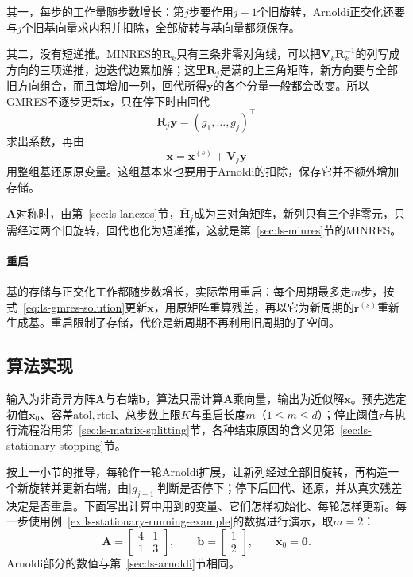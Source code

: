 其一，每步的工作量随步数增长：第$j$步要作用$j-1$个旧旋转，Arnoldi正交化还要与$j$个旧基向量求内积并扣除，全部旋转与基向量都须保存。

其二，没有短递推。MINRES的$\bm R_k$只有三条非零对角线，可以把$\bm V_k\bm R_k^{-1}$的列写成方向的三项递推，边迭代边累加解；这里$\bm R_j$是满的上三角矩阵，新方向要与全部旧方向组合，而且每增加一列，回代所得$\bm y$的各个分量一般都会改变。所以GMRES不逐步更新$\bm x$，只在停下时由回代
\begin{equation}
 \bm R_j\bm y=(g_1,\ldots,g_j)^\top
 \label{eq:ls-gmres-back-substitution}
\end{equation}
求出系数，再由
\begin{equation}
 \bm x=\bm x^{(s)}+\bm V_j\bm y
 \label{eq:ls-gmres-solution}
\end{equation}
用整组基还原原变量。这组基本来也要用于Arnoldi的扣除，保存它并不额外增加存储。

$\bm A$对称时，由第~\ref{sec:ls-lanczos}节，$\overline{\bm H}_j$成为三对角矩阵，新列只有三个非零元，只需经过两个旧旋转，回代也化为短递推，这就是第~\ref{sec:ls-minres}节的MINRES。

\paragraph{重启}
基的存储与正交化工作都随步数增长，实际常用重启：每个周期最多走$m$步，按式~\eqref{eq:ls-gmres-solution}更新$\bm x$，用原矩阵重算残差，再以它为新周期的$\bm r^{(s)}$重新生成基。重启限制了存储，代价是新周期不再利用旧周期的子空间。

\subsection{算法实现}

输入为非奇异方阵$\bm A$与右端$\bm b$，算法只需计算$\bm A$乘向量，输出为近似解$\bm x$。预先选定初值$\bm x_0$、容差$\mathrm{atol},\mathrm{rtol}$、总步数上限$K$与重启长度$m$（$1\le m\le d$）；停止阈值$\tau$与执行流程沿用第~\ref{sec:ls-matrix-splitting}节，各种结束原因的含义见第~\ref{sec:ls-stationary-stopping}节。

按上一小节的推导，每轮作一轮Arnoldi扩展，让新列经过全部旧旋转，再构造一个新旋转并更新右端，由$\lvert g_{j+1}\rvert$判断是否停下；停下后回代、还原，并从真实残差决定是否重启。下面写出计算中用到的变量、它们怎样初始化、每轮怎样更新。每一步使用例~\ref{ex:ls-stationary-running-example}的数据进行演示，取$m=2$：
\[
 \bm A=\begin{bmatrix}4&1\\1&3\end{bmatrix},\qquad
 \bm b=\begin{bmatrix}1\\2\end{bmatrix},\qquad
 \bm x_0=\bm 0 .
\]
Arnoldi部分的数值与第~\ref{sec:ls-arnoldi}节相同。

